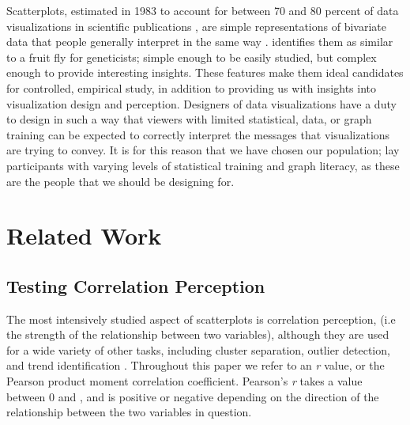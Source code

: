 \documentclass[preprint, 3p,
authoryear]{elsarticle} %
\begin{document}
Scatterplots, estimated in 1983 to account for between 70 and 80 percent
of data visualizations in scientific publications \citep{tufte_1983},
are simple representations of bivariate data that people generally
interpret in the same way \citep{kay_heer_2015}. \citet{rensink_2014}
identifies them as similar to a fruit fly for geneticists; simple enough
to be easily studied, but complex enough to provide interesting
insights. These features make them ideal candidates for controlled,
empirical study, in addition to providing us with insights into
visualization design and perception. Designers of data visualizations
have a duty to design in such a way that viewers with limited
statistical, data, or graph training can be expected to correctly
interpret the messages that visualizations are trying to convey. It is
for this reason that we have chosen our population; lay participants
with varying levels of statistical training and graph literacy, as these
are the people that we should be designing for.

\hypertarget{related-work}{%
\section{Related Work}\label{related-work}}

\hypertarget{testing}{%
\subsection{Testing Correlation Perception}\label{testing}}

The most intensively studied aspect of scatterplots is correlation
perception, (i.e the strength of the relationship between two
variables), although they are used for a wide variety of other tasks,
including cluster separation, outlier detection, and trend
identification \citep{behrisch_2021}. Throughout this paper we refer to
an \emph{r} value, or the Pearson product moment correlation
coefficient. Pearson's \emph{r} takes a value between 0 and
\textbar, and is positive or negative depending on the
direction of the relationship between the two variables in question.
\end{document}
